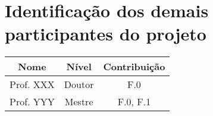 \newpage
\section{Identificação dos demais participantes do projeto}
\label{sc:participantes}

\begin{longtable}{c c c}

\toprule%
 \centering%
   \textbf{Nome}
 & \textbf{Nível}
 & \textbf{Contribuição} \\

\cmidrule[0.4pt](r{0.125em}){1-1}%
\cmidrule[0.4pt](lr{0.125em}){2-2}%
\cmidrule[0.4pt](lr{0.125em}){3-3}%
\endhead


Prof. XXX & Doutor & F.0 \\
\myrowcolour%
Prof. YYY & Mestre & F.0, F.1 \\

\bottomrule

\end{longtable}